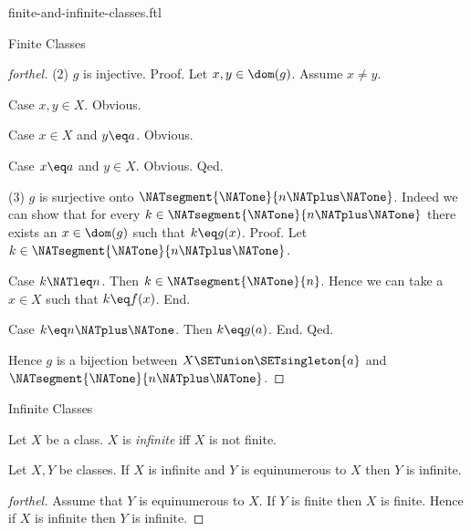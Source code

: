 \documentclass{naproche-library}
\begin{document}
\begin{smodule}[title=Finite and Infinite Classes]{finite-and-infinite-classes.ftl}
\begin{sfragment}{Finite Classes}
\begin{proof}[forthel]
    (2) $g$ is injective. \newline
    Proof.
      Let $x, y \in \dom(g)$.
      Assume $x \neq y$.
      
      Case $x, y \in X$. Obvious.

      Case $x \in X$ and $y \eq a$. Obvious.

      Case $x \eq a$ and $y \in X$. Obvious.
    Qed.

    (3) $g$ is surjective onto $\NATsegment{\NATone}{n \NATplus \NATone}$.
    Indeed we can show that for every $k \in \NATsegment{\NATone}{n \NATplus \NATone}$ there exists an $x \in \dom(g)$ such that $k \eq g(x)$. \newline
    Proof.
      Let $k \in \NATsegment{\NATone}{n \NATplus \NATone}$.

      Case $k \NATleq n$.
        Then $k \in \NATsegment{\NATone}{n}$.
        Hence we can take a $x \in X$ such that $k \eq f(x)$.
      End.

      Case $k \eq n \NATplus \NATone$.
        Then $k \eq g(a)$.
      End.
    Qed.

    Hence $g$ is a bijection between $X \SETunion \SETsingleton{a}$ and $\NATsegment{\NATone}{n \NATplus \NATone}$.
  \end{proof}
\end{sfragment}

\begin{sfragment}{Infinite Classes}
  \begin{definition}[forthel,id=FOUNDATIONS_14_6612510618681344]
    Let $X$ be a class.
    $X$ is \emph{infinite} iff $X$ is not finite.
  \end{definition}

  \begin{proposition}[forthel,id=FOUNDATIONS_14_5814530911240192]
    Let $X, Y$ be classes.
    If $X$ is infinite and $Y$ is equinumerous to $X$ then $Y$ is infinite.
  \end{proposition}
  \begin{proof}[forthel]
    Assume that $Y$ is equinumerous to $X$.
    If $Y$ is finite then $X$ is finite.
    Hence if $X$ is infinite then $Y$ is infinite.
  \end{proof}
\end{sfragment}
\end{smodule}
\end{document}
